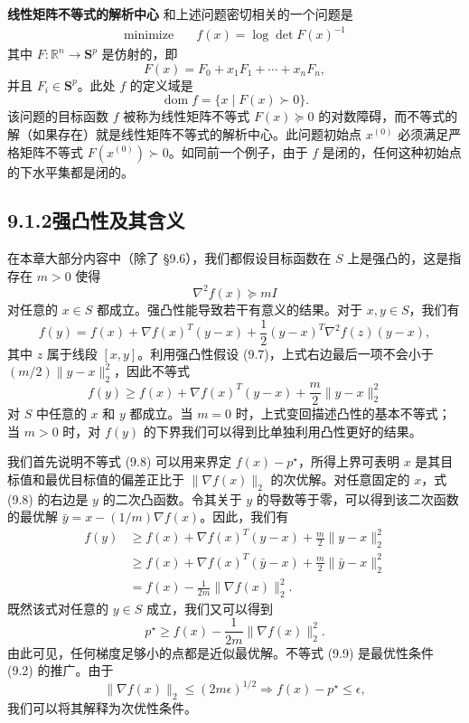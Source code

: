 \documentclass[UTF8, 12pt, fontset=fandol, oneside]{ctexart}
\begin{document}
\noindent\textbf{线性矩阵不等式的解析中心}\quad
和上述问题密切相关的一个问题是
\begin{equation}
\begin{aligned}
\text{minimize}\quad & f(x)=\log\det F(x)^{-1}
\end{aligned}
\tag{9.6}
\end{equation}
其中 $F:\mathbb{R}^n\to\mathbf{S}^p$ 是仿射的，即
\[
F(x)=F_0+x_1F_1+\cdots+x_nF_n,
\]
并且 $F_i\in\mathbf{S}^p$。此处 $f$ 的定义域是
\[
\operatorname{dom} f=\{x\mid F(x)\succ0\}.
\]
该问题的目标函数 $f$ 被称为线性矩阵不等式 $F(x)\succeq0$ 的对数障碍，而不等式的解（如果存在）就是线性矩阵不等式的解析中心。此问题初始点 $x^{(0)}$ 必须满足严格矩阵不等式 $F(x^{(0)})\succ0$。如同前一个例子，由于 $f$ 是闭的，任何这种初始点的下水平集都是闭的。

\subsection*{9.1.2\quad 强凸性及其含义}

在本章大部分内容中（除了 \S9.6），我们都假设目标函数在 $S$ 上是强凸的，这是指存在 $m>0$ 使得
\begin{equation}
\nabla^2 f(x)\succeq mI
\tag{9.7}
\end{equation}
对任意的 $x\in S$ 都成立。强凸性能导致若干有意义的结果。对于 $x,y\in S$，我们有
\[
f(y)=f(x)+\nabla f(x)^T(y-x)+\frac{1}{2}(y-x)^T\nabla^2 f(z)(y-x),
\]
其中 $z$ 属于线段 $[x,y]$。利用强凸性假设 (9.7)，上式右边最后一项不会小于 $(m/2)\|y-x\|_2^2$，因此不等式
\begin{equation}
f(y)\geq f(x)+\nabla f(x)^T(y-x)+\frac{m}{2}\|y-x\|_2^2
\tag{9.8}
\end{equation}
对 $S$ 中任意的 $x$ 和 $y$ 都成立。当 $m=0$ 时，上式变回描述凸性的基本不等式；当 $m>0$ 时，对 $f(y)$ 的下界我们可以得到比单独利用凸性更好的结果。

我们首先说明不等式 (9.8) 可以用来界定 $f(x)-p^\star$，所得上界可表明 $x$ 是其目标值和最优目标值的偏差正比于 $\|\nabla f(x)\|_2$ 的次优解。对任意固定的 $x$，式 (9.8) 的右边是 $y$ 的二次凸函数。令其关于 $y$ 的导数等于零，可以得到该二次函数的最优解 $\bar{y}=x-(1/m)\nabla f(x)$。因此，我们有
\[
\begin{aligned}
f(y)&\geq f(x)+\nabla f(x)^T(y-x)+\frac{m}{2}\|y-x\|_2^2\\
&\geq f(x)+\nabla f(x)^T(\bar{y}-x)+\frac{m}{2}\|\bar{y}-x\|_2^2\\
&=f(x)-\frac{1}{2m}\|\nabla f(x)\|_2^2.
\end{aligned}
\]
既然该式对任意的 $y\in S$ 成立，我们又可以得到
\begin{equation}
p^\star\geq f(x)-\frac{1}{2m}\|\nabla f(x)\|_2^2.
\tag{9.9}
\end{equation}
由此可见，任何梯度足够小的点都是近似最优解。不等式 (9.9) 是最优性条件 (9.2) 的推广。由于
\begin{equation}
\|\nabla f(x)\|_2\leq(2m\epsilon)^{1/2}\Longrightarrow f(x)-p^\star\leq\epsilon,
\tag{9.10}
\end{equation}
我们可以将其解释为次优性条件。
\end{document}
